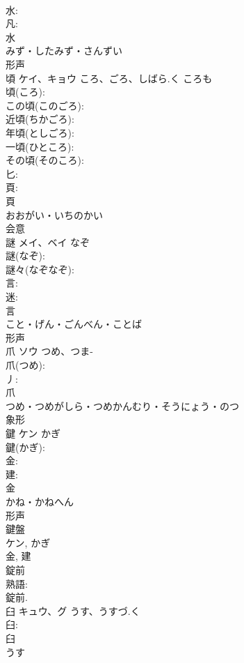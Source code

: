 \documentclass[8pt]{extreport}
\begin{document}
\begin{CJK}{UTF8}{min}
\\	水: 
\\	凡: 
\\	水	
\\	みず・したみず・さんずい	
\\	形声 
\\	頃	ケイ、キョウ	ころ、ごろ、しばら.く	ころも	
\\	頃(ころ): 
\\	この頃(このごろ): 
\\	近頃(ちかごろ): 
\\	年頃(としごろ): 
\\	一頃(ひところ): 
\\	その頃(そのころ): 
\\	匕: 
\\	頁: 
\\	頁	
\\	おおがい・いちのかい	
\\	会意 
\\	謎	メイ、ベイ	なぞ		
\\	謎(なぞ): 
\\	謎々(なぞなぞ): 
\\	言: 
\\	迷: 
\\	言	
\\	こと・げん・ごんべん・ことば	
\\	形声 
\\	爪	ソウ	つめ、つま-		
\\	爪(つめ): 
\\	丿: 
\\	爪	
\\	つめ・つめがしら・つめかんむり・そうにょう・のつ	
\\	象形 
\\	鍵	ケン	かぎ		
\\	鍵(かぎ): 
\\	金: 
\\	建: 
\\	金	
\\	かね・かねへん	
\\	形声 
\\	鍵盤
\\	ケン, かぎ 
\\	金, 建 
\\	錠前 
\\	熟語: 
\\	錠前.
\\	臼	キュウ、グ	うす、うすづ.く		
\\	臼: 
\\	臼	
\\	うす	

\end{CJK}
\end{document}
